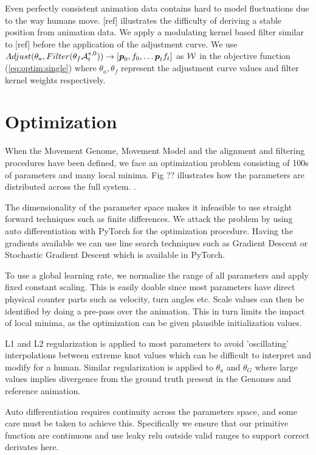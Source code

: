 Even perfectly consistent animation data contains hard to model fluctuations due to the way humans move. [ref] illustrates the difficulty of deriving a stable position from animation data. We apply a modulating kernel based filter similar to [ref] before the application of the adjustment curve. We use $Adjust(\theta_a,Filter(\theta_f\mathcal{A}^{s,0}_t))\rightarrow{}[\boldsymbol{p }_0,f_0, \ldots \boldsymbol{p }_tf_t]$ as $\mathcal{W}$ in the objective function (\ref{eq:optim:single}) where $\theta_a, \theta_f$ represent the adjustment curve values and filter kernel weights respectively.

\section{Optimization}
When the Movement Genome, Movement Model and the alignment and filtering procedures have been defined, we face an optimization problem consisting of 100s of parameters and many local minima. Fig ?? illustrates how the parameters are distributed across the full system. .

The dimensionality of the parameter space makes it infeasible to use straight forward techniques such as finite differences. We attack the problem by using auto differentiation with PyTorch for the optimization procedure. Having the gradients available we can use line search techniques such as Gradient Descent or Stochastic Gradient Descent which is available in PyTorch.

To use a global learning rate, we normalize the range of all parameters and apply fixed constant scaling. This is easily doable since most parameters have direct physical counter parts such as velocity, turn angles etc. Scale values can then be identified by doing a pre-pass over the animation. This in turn limits the impact of local minima, as the optimization can be given plausible initialization values.

L1 and L2 regularization is applied to most parameters to avoid 'oscillating' interpolations between extreme knot values which can be difficult to interpret and modify for a human. Similar regularization is applied to $\theta_a$ and $\theta_G$ where large values implies divergence from the ground truth present in the Genomes and reference animation.

Auto differentiation requires continuity across the parameters space, and some care must be taken to achieve this. Specifically we ensure that our primitive function are continuous and use leaky relu outside valid ranges to support correct derivates here. 



